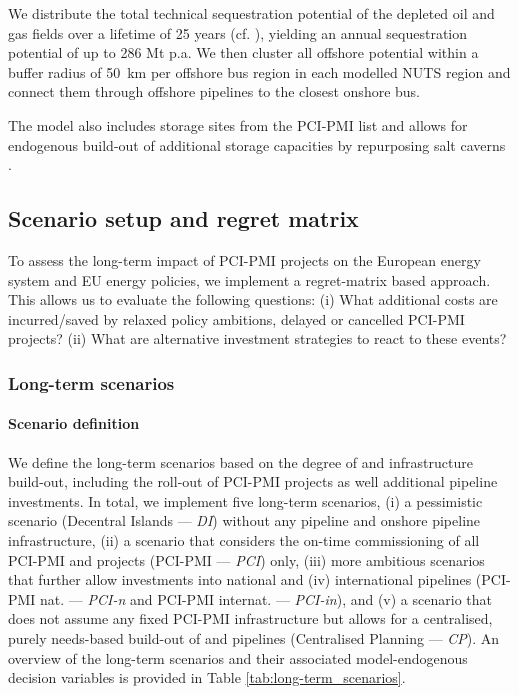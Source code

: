 \documentclass[final,5p,times,twocolumn,sort&compress]{elsarticle}
\begin{document}
We distribute the total technical sequestration potential of the depleted oil and gas fields over a lifetime of 25 years (cf. \cite{hofmannH2CO2Network2025}), yielding an annual sequestration potential of up to 286 Mt p.a. We then cluster all offshore potential within a buffer radius of \SI{50}{km} per offshore bus region in each modelled NUTS region and connect them through offshore  pipelines to the closest onshore bus. 

The model also includes  storage sites from the PCI-PMI list and allows for endogenous build-out of additional storage capacities by repurposing salt caverns \cite{neumannPotentialRoleHydrogen2023}.

\subsection{Scenario setup and regret matrix}
\label{sec:scenario_setup}
To assess the long-term impact of PCI-PMI projects on the European energy system and EU energy policies, we implement a regret-matrix based approach. This allows us to evaluate the following questions: (i) What additional costs are incurred/saved by relaxed policy ambitions, delayed or cancelled PCI-PMI projects? (ii) What are alternative investment strategies to react to these events? 

\subsubsection{Long-term scenarios}
\paragraph{Scenario definition}
\label{sec:definition}
We define the long-term scenarios based on the degree of  and  infrastructure build-out, including the roll-out of PCI-PMI projects as well additional pipeline investments. In total, we implement five long-term scenarios, (i) a pessimistic scenario (Decentral Islands --- \textit{DI}) without any  pipeline and onshore  pipeline infrastructure, (ii) a scenario that considers the on-time commissioning of all PCI-PMI  and  projects (PCI-PMI --- \textit{PCI}) only, (iii) more ambitious scenarios that further allow investments into national and (iv) international pipelines (PCI-PMI nat. --- \textit{PCI-n} and PCI-PMI internat. --- \textit{PCI-in}), and (v) a scenario that does not assume any fixed PCI-PMI infrastructure but allows for a centralised, purely needs-based build-out of  and  pipelines (Centralised Planning --- \textit{CP}). An overview of the long-term scenarios and their associated model-endogenous decision variables is provided in Table \ref{tab:long-term_scenarios}. 
\end{document}
